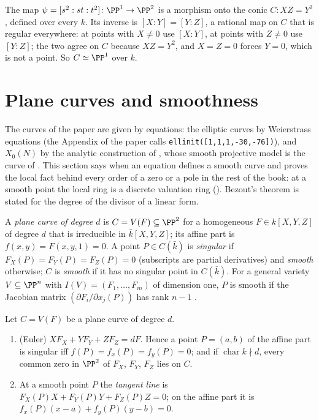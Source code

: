 \begin{example}\label{ex:curves:conic}
The map $\psi=[s^2:st:t^2]\colon\PP^1\to\PP^2$ is a morphism onto the conic $C\colon XZ=Y^2$, defined over every $k$. Its inverse is
$[X:Y]=[Y:Z]$, a rational map on $C$ that is regular everywhere: at points with $X\ne0$ use $[X:Y]$, at points with $Z\ne0$ use $[Y:Z]$; the two
agree on $C$ because $XZ=Y^2$, and $X=Z=0$ forces $Y=0$, which is not a point. So $C\simeq\PP^1$ over $k$.
\end{example}

\section{Plane curves and smoothness}\label{sec:curves:plane}

The curves of the paper are given by equations: the elliptic curves by Weierstrass equations (the Appendix of the paper calls
\texttt{ellinit([1,1,1,-30,-76])}), and $X_0(N)$ by the analytic construction of , whose smooth projective
model is the curve of . This section says when an equation defines a smooth curve and proves the
local fact behind every order of a zero or a pole in the rest of the book: at a smooth point the local ring is a discrete
valuation ring (). Bezout's theorem is stated for the degree of the divisor of a linear form.

\begin{definition}\label{def:curves:plane-curve}
A \emph{plane curve of degree $d$} is $C=V(F)\subseteq\PP^2$ for a homogeneous $F\in k[X,Y,Z]$ of degree $d$ that is irreducible in $\bar k[X,Y,Z]$; its
affine part is $f(x,y)=F(x,y,1)=0$. A point $P\in C(\bar k)$ is \emph{singular} if $F_X(P)=F_Y(P)=F_Z(P)=0$ (subscripts are partial derivatives) and
\emph{smooth} otherwise; $C$ is \emph{smooth} if it has no singular point in $C(\bar k)$. For a general variety $V\subseteq\PP^n$ with $I(V)=(F_1,\dots,F_m)$
of dimension one, $P$ is smooth if the Jacobian matrix $(\partial F_i/\partial x_j(P))$ has rank $n-1$ \cite[Chapter I, Section 1]{SilvermanAEC}.
\end{definition}

\begin{proposition}\label{prop:curves:euler}
Let $C=V(F)$ be a plane curve of degree $d$.
\begin{enumerate}[label=(\roman*)]
\item (Euler) $XF_X+YF_Y+ZF_Z=dF$. Hence a point $P=(a,b)$ of the affine part is singular iff $f(P)=f_x(P)=f_y(P)=0$; and if $\operatorname{char}k\nmid d$,
every common zero in $\PP^2$ of $F_X$, $F_Y$, $F_Z$ lies on $C$.
\item At a smooth point $P$ the \emph{tangent line} is $F_X(P)X+F_Y(P)Y+F_Z(P)Z=0$; on the affine part it is $f_x(P)(x-a)+f_y(P)(y-b)=0$.
\end{enumerate}
\end{proposition}

